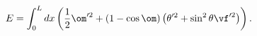 \begin{equation*}
  E=\int_0^L dx\left(\frac12\om^{\prime2}+(1-\cos\om)
  \left(\theta^{\prime2}+\sin^2\theta\vf^{\prime2}\right)\right).
\end{equation*}

